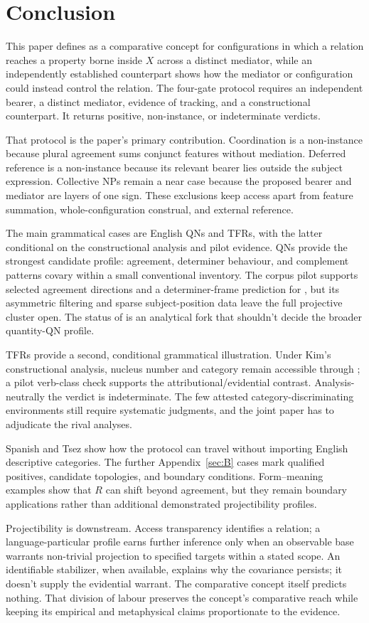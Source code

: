 \section{Conclusion}

This paper defines  as a comparative concept for configurations in which a relation reaches a property borne inside $X$ across a distinct mediator, while an independently established counterpart shows how the mediator or configuration could instead control the relation. The four-gate protocol requires an independent bearer, a distinct mediator, evidence of tracking, and a constructional counterpart. It returns positive, non-instance, or indeterminate verdicts.

That protocol is the paper's primary contribution. Coordination is a non-instance because plural agreement sums conjunct features without mediation. Deferred reference is a non-instance because its relevant bearer lies outside the subject expression. Collective NPs remain a near case because the proposed bearer and mediator are layers of one sign. These exclusions keep access apart from feature summation, whole-configuration construal, and external reference.

The main grammatical cases are English QNs and TFRs, with the latter conditional on the constructional analysis and pilot evidence. QNs provide the strongest candidate profile: agreement, determiner behaviour, and complement patterns covary within a small conventional inventory. The corpus pilot supports selected agreement directions and a determiner-frame prediction for , but its asymmetric filtering and sparse subject-position data leave the full projective cluster open. The status of  is an analytical fork that shouldn't decide the broader quantity-QN profile.

TFRs provide a second, conditional grammatical illustration. Under Kim's constructional analysis, nucleus number and category remain accessible through ; a pilot verb-class check supports the attributional/evidential contrast. Analysis-neutrally the verdict is indeterminate. The few attested category-discriminating environments still require systematic judgments, and the joint paper has to adjudicate the rival analyses.

Spanish and Tsez show how the protocol can travel without importing English descriptive categories. The further Appendix~\ref{sec:B} cases mark qualified positives, candidate topologies, and boundary conditions. Form--meaning examples show that $R$ can shift beyond agreement, but they remain boundary applications rather than additional demonstrated projectibility profiles.

Projectibility is downstream. Access transparency identifies a relation; a language-particular profile earns further inference only when an observable base warrants non-trivial projection to specified targets within a stated scope. An identifiable stabilizer, when available, explains why the covariance persists; it doesn't supply the evidential warrant. The comparative concept itself predicts nothing. That division of labour preserves the concept's comparative reach while keeping its empirical and metaphysical claims proportionate to the evidence.
